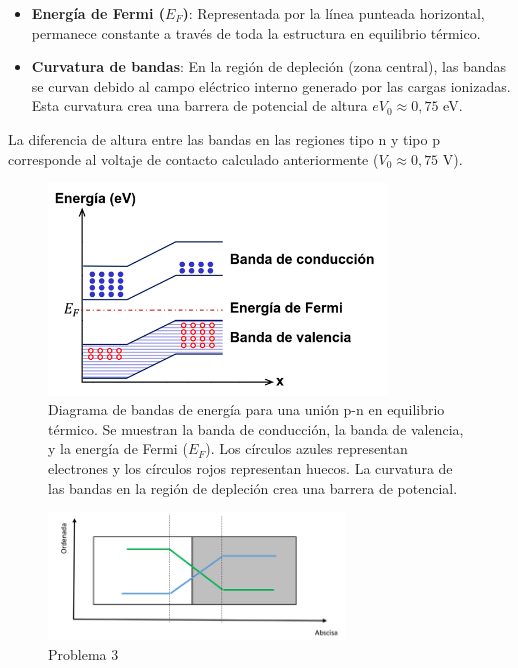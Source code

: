 \documentclass[
  11pt,
  letterpaper,
   addpoints,
   answers
  ]{exam}
\begin{document}
\begin{questions}
\begin{solution}
\begin{itemize}
        \item \textbf{Energía de Fermi ($E_F$)}: Representada por la línea punteada horizontal, permanece constante a través de toda la estructura en equilibrio térmico.
        
        \item \textbf{Curvatura de bandas}: En la región de depleción (zona central), las bandas se curvan debido al campo eléctrico interno generado por las cargas ionizadas. Esta curvatura crea una barrera de potencial de altura $eV_0 \approx 0{,}75$ eV.
    \end{itemize}

    La diferencia de altura entre las bandas en las regiones tipo n y tipo p corresponde al voltaje de contacto calculado anteriormente ($V_0 \approx 0{,}75$ V).

    \begin{figure}[H]
        \centering
        \includegraphics[width=0.8\textwidth]{../figures/Auxiliar_2_10}
        \caption{Diagrama de bandas de energía para una unión p-n en equilibrio térmico. Se muestran la banda de conducción, la banda de valencia, y la energía de Fermi ($E_F$). Los círculos azules representan electrones y los círculos rojos representan huecos. La curvatura de las bandas en la región de depleción crea una barrera de potencial.}
        \label{fig:bandas_pn}
    \end{figure}

\end{solution}
\begin{figure}[H]
    \centering
    \includegraphics[width=0.7\textwidth]{../figures/Auxiliar_2_1}
    \caption{Problema 3}
    \label{fig:p3}
\end{figure}


\end{questions}
\end{document}
